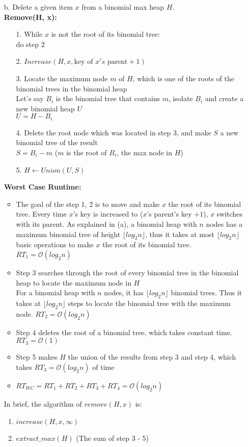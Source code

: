 \documentclass[10pt]{article}
\begin{document}
\begin{enumerate}
\item[b.]Delete a given item $x$ from a binomial max heap $H$.\\
\textbf{Remove(H, x):}
\begin{enumerate}
\item[1.]While $x$ is not the root of its binomial tree: \\do step 2
\item[2.]$Increase(H, x, \text{key of }x's\text{ parent} + 1)$
\item[3.]Locate the maximum node $m$ of $H$, which is one of the roots of the binomial trees in the binomial heap\\
Let's say $B_i$ is the binomial tree that contains $m$, isolate $B_i$ and create a new binomial heap $U$\\
$U=H-B_i$
\item[4.]Delete the root node which was located in step 3, and make $S$ a new binomial tree of the result\\
$S=B_i-m$ \null\hfill ($m$ is the root of $B_i$, the max node in $H$)
\item[5.]$H\leftarrow Union(U,S)$
\end{enumerate}
\textbf{Worst Case Runtime:}
\begin{itemize}
\item
The goal of the step 1, 2 is to move and make $x$ the root of its binomial tree. Every time $x$'s key is increased to ($x$'s parent's key $+1$), $x$ switches with its parent. As explained in (a), a binomial heap with $n$ nodes has a maximum binomial tree of height $\lfloor log_2n\rfloor$, thus it takes at most $\lfloor log_2n\rfloor$ basic operations to make $x$ the root of its binomial tree. $RT_1=\mathcal{O}(log_2n)$
\item
Step 3 searches through the root of every binomial tree in the binomial heap to locate the maximum node in $H$\\
For a binomial heap with $n$ nodes, it has $\lfloor log_2n\rfloor$ binomial trees. Thus it takes at $\lfloor log_2n\rfloor$ steps to locate the binomial tree with the maximum node. $RT_2=\mathcal{O}(log_2n)$
\item
Step 4 deletes the root of a binomial tree, which takes constant time. $RT_3=\mathcal{O}(1)$
\item 
Step 5 makes $H$ the union of the results from step 3 and step 4, which takes $RT_3=\mathcal{O}(log_2n)$ of time
\item
$RT_{WC} = RT_1 + RT_2 + RT_3 + RT_4 = \mathcal{O}(log_2n)$
\end{itemize}
In brief, the algorithm of $remove(H, x)$ is:
\begin{enumerate}
\item $increase(H,x,\infty)$
\item $extract\_max(H)$ \null\hfill (The sum of step 3 - 5)
\end{enumerate}
\end{enumerate}
\newpage
\end{document}
